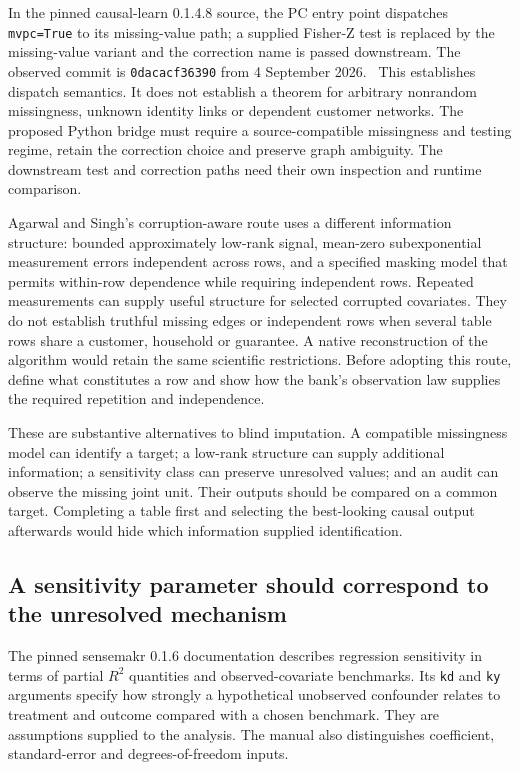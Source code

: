 In the pinned causal-learn 0.1.4.8 source, the PC entry point dispatches
\texttt{mvpc=True} to its missing-value path; a supplied Fisher-Z test is
replaced by the missing-value variant and the correction name is passed
downstream. The observed commit is \texttt{0dacacf36390} from 4 September
2026.~\citep{v12_sw_causallearn} This establishes dispatch semantics. It
does not establish a theorem for arbitrary nonrandom missingness, unknown
identity links or dependent customer networks. The proposed Python bridge
must require a source-compatible missingness and testing regime, retain the
correction choice and preserve graph ambiguity. The downstream test and
correction paths need their own inspection and runtime comparison.

Agarwal and Singh's corruption-aware route uses a different information
structure: bounded approximately low-rank signal, mean-zero subexponential
measurement errors independent across rows, and a specified masking model
that permits within-row dependence while requiring independent rows.
\citep[Section 5.1, Assumptions 5.1--5.3]{corrupt2022} Repeated measurements
can supply useful structure for selected corrupted covariates. They do not
establish truthful missing edges or independent rows when several table rows
share a customer, household or guarantee. A native reconstruction of the
algorithm would retain the same scientific restrictions. Before adopting
this route, define what constitutes a row and show how the bank's observation
law supplies the required repetition and independence.

These are substantive alternatives to blind imputation. A compatible
missingness model can identify a target; a low-rank structure can supply
additional information; a sensitivity class can preserve unresolved values;
and an audit can observe the missing joint unit. Their outputs should be
compared on a common target. Completing a table first and selecting the
best-looking causal output afterwards would hide which information supplied
identification.

\subsection{A sensitivity parameter should correspond to the unresolved mechanism}

The pinned sensemakr 0.1.6 documentation describes regression sensitivity in
terms of partial $R^2$ quantities and observed-covariate benchmarks. Its
\texttt{kd} and \texttt{ky} arguments specify how strongly a hypothetical
unobserved confounder relates to treatment and outcome compared with a chosen
benchmark. They are assumptions supplied to the analysis. The manual also
distinguishes coefficient, standard-error and degrees-of-freedom inputs.
\citep{v12_sw_sensemakr}

